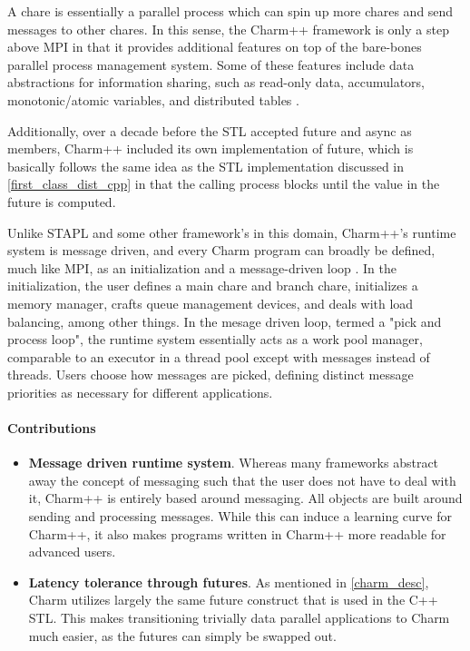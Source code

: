 {A chare is essentially a parallel process which can spin up more chares and send messages to other chares. In this sense, the Charm++ framework is only a step above MPI in that it provides additional features on top of the bare-bones parallel process management system. Some of these features include data abstractions for information sharing, such as read-only data, accumulators, monotonic/atomic variables, and distributed tables \cite{charm_93}. 

Additionally, over a decade before the STL accepted future and async as members, Charm++ included its own implementation of future, which is basically follows the same idea as the STL implementation discussed in \ref{first_class_dist_cpp} in that the calling process blocks until the value in the future is computed. 

Unlike STAPL and some other framework's in this domain, Charm++'s runtime system is message driven, and every Charm program can broadly be defined, much like MPI, as an initialization and a message-driven loop \cite{charm_rts}. In the initialization, the user defines a main chare and branch chare, initializes a memory manager, crafts queue management devices, and deals with load balancing, among other things. In the mesage driven loop, termed a "pick and process loop", the runtime system essentially acts as a work pool manager, comparable to an executor in a thread pool except with messages instead of threads. Users choose how messages are picked, defining distinct message priorities as necessary for different applications.  
\paragraph{Contributions}
	\begin{itemize}
		\item \textbf{Message driven runtime system}. Whereas many frameworks abstract away the concept of messaging such that the user does not have to deal with it, Charm++ is entirely based around messaging. All objects are built around sending and processing messages. While this can induce a learning curve for Charm++, it also makes programs written in Charm++ more readable for advanced users.  
		\item \textbf{Latency tolerance through futures}. As mentioned in \ref{charm_desc}, Charm utilizes largely the same future construct that is used in the C++ STL. This makes transitioning trivially data parallel applications to Charm much easier, as the futures can simply be swapped out.   
		

\end{itemize}}
